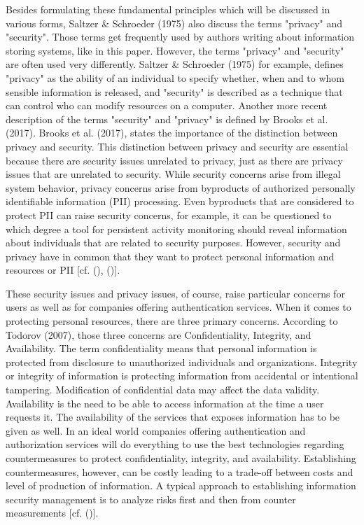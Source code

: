 Besides formulating these fundamental principles which will be discussed in various forms,  Saltzer \& Schroeder (1975) also discuss the terms "privacy" and "security". Those terms get frequently used by authors writing about information storing systems, like in this paper. However, the terms "privacy" and "security" are often used very differently.  Saltzer \& Schroeder (1975) for example, defines "privacy" as the ability of an individual to specify whether, when and to whom sensible information is released, and "security" is described as a technique that can control who can modify resources on a computer. Another more recent description of the terms "security" and "privacy" is defined by Brooks et al. (2017). Brooks et al. (2017), states the importance of the distinction between privacy and security. This distinction between privacy and security are essential because there are security issues unrelated to privacy, just as there are privacy issues that are unrelated to security. While security concerns arise from illegal system behavior, privacy concerns arise from byproducts of authorized personally identifiable information (PII) processing. Even byproducts that are considered to protect PII can raise security concerns, for example, it can be questioned to which degree a tool for persistent activity monitoring should reveal information about individuals that are related to security purposes. However, security and privacy have in common that they want to protect personal information and resources or PII [cf. (\cite{Brooks:2017:IPE}), (\cite{Saltzer:PICS})].

These security issues and privacy issues, of course, raise particular concerns for users as well as for companies offering authentication services. When it comes to protecting personal resources, there are three primary concerns. According to Todorov (2007), those three concerns are Confidentiality, Integrity, and Availability. The term confidentiality means that personal information is protected from disclosure to unauthorized individuals and organizations. Integrity or integrity of information is protecting information from accidental or intentional tampering. Modification of confidential data may affect the data validity. Availability is the need to be able to access information at the time a user requests it. The availability of the services that exposes information has to be given as well. In an ideal world companies offering authentication and authorization services will do everything to use the best technologies regarding countermeasures to protect confidentiality, integrity, and availability. Establishing countermeasures, however, can be costly leading to a trade-off between costs and level of production of information. A typical approach to establishing information security management is to analyze risks first and then from counter measurements [cf. (\cite{Todorov:2007:MUI})]. 

